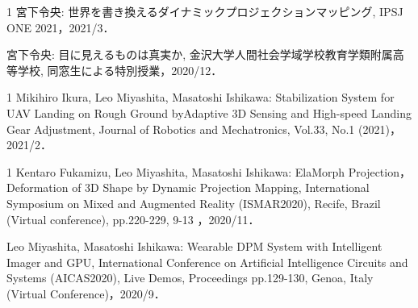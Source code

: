 \begin{招待講演}{1}
宮下令央: 世界を書き換えるダイナミックプロジェクションマッピング, IPSJ ONE 2021，2021/3．

宮下令央: 目に見えるものは真実か, 金沢大学人間社会学域学校教育学類附属高等学校, 同窓生による特別授業，2020/12．

\end{招待講演}

\begin{雑誌論文}{1}
Mikihiro Ikura, Leo Miyashita, Masatoshi Ishikawa: Stabilization System for UAV Landing on Rough Ground byAdaptive 3D Sensing and High-speed Landing Gear Adjustment, Journal of Robotics and Mechatronics, Vol.33, No.1 (2021)，2021/2．

\end{雑誌論文}

\begin{査読付}{1}
Kentaro Fukamizu, Leo Miyashita, Masatoshi Ishikawa: ElaMorph Projection，Deformation of 3D Shape by Dynamic Projection Mapping, International Symposium on Mixed and Augmented Reality (ISMAR2020), Recife, Brazil (Virtual conference), pp.220-229, 9-13 ，2020/11．

Leo Miyashita, Masatoshi Ishikawa: Wearable DPM System with Intelligent Imager and GPU, International Conference on Artificial Intelligence Circuits and Systems (AICAS2020), Live Demos, Proceedings pp.129-130, Genoa, Italy (Virtual Conference)，2020/9．

\end{査読付}


